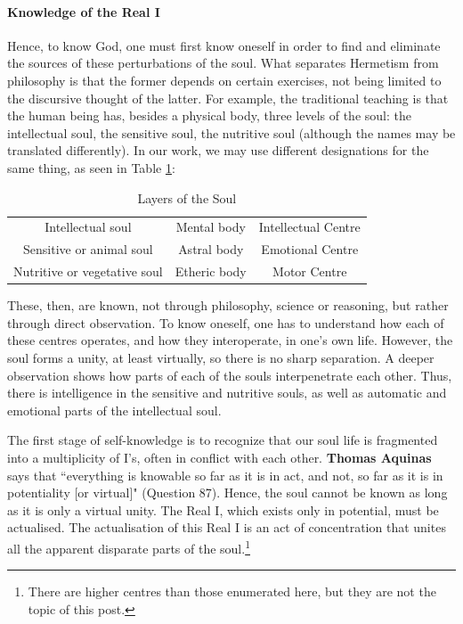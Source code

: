 \paragraph{Knowledge of the Real I}
Hence, to know God, one must first know oneself in order to find and eliminate the sources of these perturbations of the
soul. What separates Hermetism from philosophy is that the former depends on certain exercises, not being limited to
the discursive thought of the latter. For example, the traditional teaching is that the human being has, besides a
physical body, three levels of the soul: the intellectual soul, the sensitive soul, the nutritive soul (although the
names may be translated differently). In our work, we may use different designations for the same thing, as seen in Table \ref{tab:LayersSoul}:

\begin{table}[h]
\begin{tabular}{ccc}\toprule
Intellectual soul &
Mental body &
Intellectual Centre\\
Sensitive or animal soul &
Astral body &
Emotional Centre\\
Nutritive or vegetative soul &
Etheric body &
Motor Centre\\\bottomrule
\end{tabular}
\caption{Layers of the Soul}
\label{tab:LayersSoul}
\end{table}

These, then, are known, not through philosophy, science or reasoning, but rather through direct observation. To know
oneself, one has to understand how each of these centres operates, and how they interoperate, in
one's own life. However, the soul forms a unity, at least virtually, so there is no sharp
separation. A deeper observation shows how parts of each of the souls interpenetrate each other. Thus, there is
intelligence in the sensitive and nutritive souls, as well as automatic and emotional parts of the intellectual soul.

The first stage of self-knowledge is to recognize that our soul life is fragmented into a multiplicity of
I's, often in conflict with each other. \textbf{Thomas Aquinas} says that ``everything is knowable
so far as it is in act, and not, so far as it is in potentiality [or virtual]" (Question 87). Hence, the soul cannot be
known as long as it is only a virtual unity. The Real I, which exists only in potential, must be actualised. The
actualisation of this Real I is an act of concentration that unites all the apparent disparate parts of the soul.\footnote{There are higher centres than those enumerated here, but they are not the topic of this post.}

